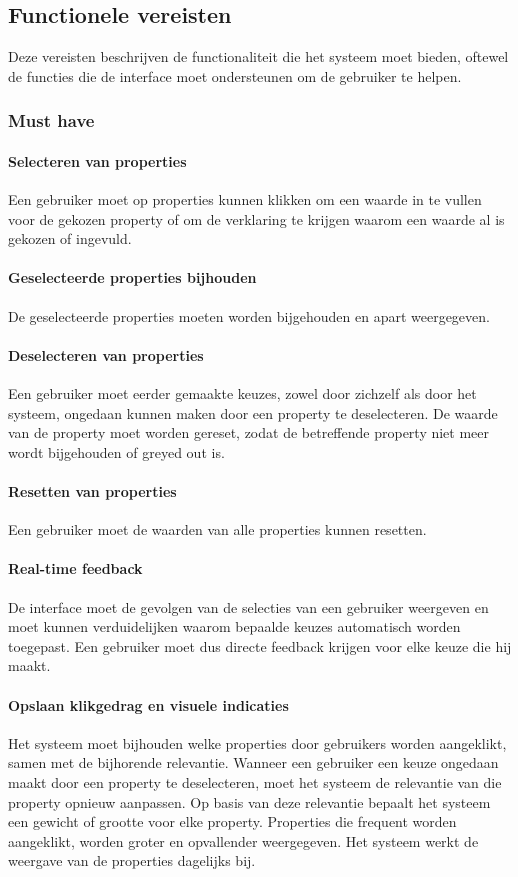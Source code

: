 \subsection{Functionele vereisten}
Deze vereisten beschrijven de functionaliteit die het systeem moet bieden, oftewel de functies die de interface moet ondersteunen om de gebruiker te helpen.

\subsubsection{Must have}
\paragraph{Selecteren van properties}
Een gebruiker moet op properties kunnen klikken om een waarde in te vullen voor de gekozen property of om de verklaring te krijgen waarom een waarde al is gekozen of ingevuld.

\paragraph{Geselecteerde properties bijhouden}
De geselecteerde properties moeten worden bijgehouden en apart weergegeven.

\paragraph{Deselecteren van properties}
Een gebruiker moet eerder gemaakte keuzes, zowel door zichzelf als door het systeem, ongedaan kunnen maken door een property te deselecteren. De waarde van de property moet worden gereset, zodat de betreffende property niet meer wordt bijgehouden of greyed out is.

\paragraph{Resetten van properties}
Een gebruiker moet de waarden van alle properties kunnen resetten.

\paragraph{Real-time feedback}
De interface moet de gevolgen van de selecties van een gebruiker weergeven en moet kunnen verduidelijken waarom bepaalde keuzes automatisch worden toegepast. Een gebruiker moet dus directe feedback krijgen voor elke keuze die hij maakt.

\paragraph{Opslaan klikgedrag en visuele indicaties}
Het systeem moet bijhouden welke properties door gebruikers worden aangeklikt, samen met de bijhorende relevantie. Wanneer een gebruiker een keuze ongedaan maakt door een property te deselecteren, moet het systeem de relevantie van die property opnieuw aanpassen. Op basis van deze relevantie bepaalt het systeem een gewicht of grootte voor elke property. Properties die frequent worden aangeklikt, worden groter en opvallender weergegeven. Het systeem werkt de weergave van de properties dagelijks bij.

